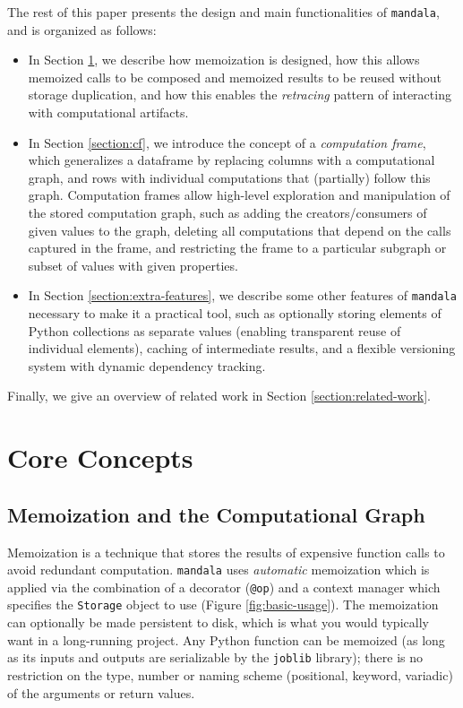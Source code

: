 \documentclass{article} %
\begin{document}
The rest of this paper presents the design and main functionalities of
\texttt{mandala}, and is organized as follows: 
\begin{itemize}
\item In Section \ref{section:core-concepts}, we describe how memoization is
designed, how this allows memoized calls to be composed and memoized results to
be reused without storage duplication, and how this enables the \emph{retracing}
pattern of interacting with computational artifacts.
\item In Section \ref{section:cf}, we introduce the concept of a
\emph{computation frame}, which generalizes a dataframe by replacing columns
with a computational graph, and rows with individual computations that
(partially) follow this graph. Computation frames allow high-level exploration
and manipulation of the stored computation graph, such as adding the
creators/consumers of given values to the graph, deleting all computations that
depend on the calls captured in the frame, and restricting the frame to a
particular subgraph or subset of values with given properties.
\item In Section \ref{section:extra-features}, we describe some other features of
\texttt{mandala} necessary to make it a practical tool, such as optionally
storing elements of Python collections as separate values (enabling transparent
reuse of individual elements), caching of intermediate results, and a flexible
versioning system with dynamic dependency tracking.
\end{itemize}

Finally, we give an overview of related work in Section \ref{section:related-work}.

\section{Core Concepts}
\label{section:core-concepts}

\subsection{Memoization and the Computational Graph}

Memoization is a technique that stores the results of expensive function calls
to avoid redundant computation. \texttt{mandala} uses \emph{automatic}
memoization \citep{norvig1991techniques} which is applied via the combination of
a decorator (\texttt{@op}) and a context manager which specifies the
\texttt{Storage} object to use (Figure \ref{fig:basic-usage}). The memoization
can optionally be made persistent to disk, which is what you would typically want in a
long-running project. Any Python function can be memoized (as long as its inputs
and outputs are serializable by the \texttt{joblib} library); there is no
restriction on the type, number or naming scheme (positional, keyword, variadic)
of the arguments or return values.
\end{document}
